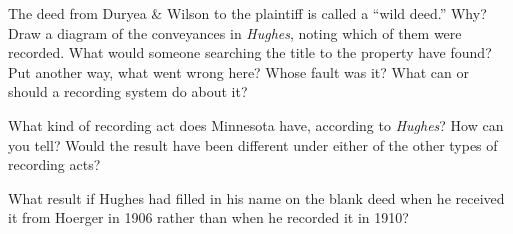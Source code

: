 \item The deed from Duryea \& Wilson to the plaintiff is called a ``wild deed.''
Why? Draw a diagram of the conveyances in \textit{Hughes}, noting which of them
were recorded. What would someone searching the title to the property have
found? Put another way, what went wrong here? Whose fault was it? What can or
should a recording system do about it?


\item What kind of recording act does Minnesota have, according to
\textit{Hughes}? How can you tell? Would the result have been different under
either of the other types of recording acts?


\item What result if Hughes had filled in his name on the blank deed when he
received it from Hoerger in 1906 rather than when he recorded it in 1910?

